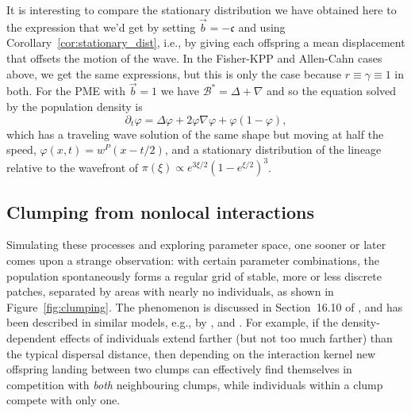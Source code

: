\documentclass[12pt]{article}
\newcommand{\grad}{\nabla}
\newcommand{\DG}{\mathcal{B}}  %
\newcommand{\meanq}{\vec b}    %
\newcommand{\wavespeed}{\mathfrak{c}}    %
\newcommand{\Lgen}{\mathcal{L}}    %
\newcommand{\comment}[1]{{\color{blue} \it #1}}
\numberwithin{equation}{section}
\begin{document}
It is interesting to compare the stationary distribution we have obtained here
to the expression that we'd get by setting $\meanq = -\wavespeed$
and using Corollary~\ref{cor:stationary_dist},
i.e., by giving each offspring a mean displacement that offsets the motion of the wave.
In the Fisher-KPP and Allen-Cahn cases above, we get the same expressions,
but this is only the case because $r\equiv\gamma\equiv1$ in both.
For the PME with $\meanq = 1$ we have $\DG^* = \Delta + \grad$ 
and so the equation solved by the population density is
$$
    \partial_t \varphi = \Delta \varphi + 2 \varphi \grad \varphi + \varphi (1 - \varphi) ,
$$
which has a traveling wave solution of the same shape but moving at half the speed,
$\varphi(x,t) = w^{P}(x-t/2)$,
and a stationary distribution of the lineage relative to the wavefront of
$\pi(\xi) \propto e^{3\xi/2} (1 - e^{\xi/2})^3$.



\subsection{Clumping from nonlocal interactions}

Simulating these processes and exploring parameter space,
one sooner or later comes upon a strange observation:
with certain parameter combinations, the population spontaneously forms a regular grid
of stable, more or less discrete patches, separated by areas with nearly no individuals,
as shown in Figure~\ref{fig:clumping}.
The phenomenon is discussed in Section~16.10 of \citet{haller2022evolutionary},
and has been described in similar models, e.g.,
by \citet{britton1990spatial,sasaki1997clumped,hernandezgarcia2004clustering,young2001reproductive}, and \citet{berestycki2009nonlocal}.
For example, if the density-dependent effects of individuals extend farther (but not too much farther)
than the typical dispersal distance,
then depending on the interaction kernel
new offspring landing between two clumps
can effectively find themselves in competition with 
\emph{both} neighbouring clumps,
while individuals within a clump compete with only one.
\end{document}
